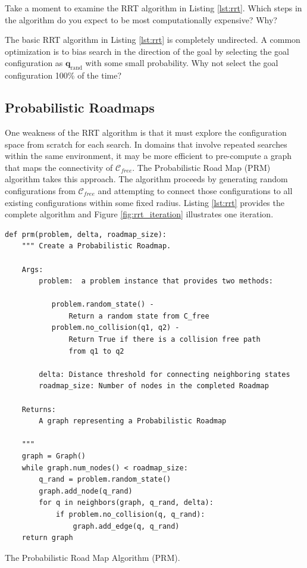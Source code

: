 \begin{exercise}
  Take a moment to examine the RRT algorithm in Listing \ref{lst:rrt}.
  Which steps in the algorithm do you expect to be most
  computationally expensive? Why?
\end{exercise}

\begin{exercise}
  The basic RRT algorithm in Listing \ref{lst:rrt} is completely
  undirected.  A common optimization is to bias search in the
  direction of the goal by selecting the goal configuration as
  $\mathbf{q}_{\text{rand}}$ with some small probability.  Why not
  select the goal configuration 100\% of the time?
\end{exercise}




\subsection{Probabilistic Roadmaps}

One weakness of the RRT algorithm is that it must explore the
configuration space from scratch for each search.  In domains that
involve repeated searches within the same environment, it may be more
efficient to pre-compute a graph that maps the connectivity of
$\mathcal{C}_{free}$. The Probabilistic Road Map (PRM) algorithm takes
this approach.  The algorithm proceeds by generating random
configurations from $\mathcal{C}_{free}$ and attempting to connect
those configurations to all existing configurations within some fixed
radius. Listing \ref{lst:rrt} provides the complete algorithm and
Figure \ref{fig:rrt_iteration} illustrates one iteration.

\begin{listing}[H]
\begin{verbatim}
def prm(problem, delta, roadmap_size):
    """ Create a Probabilistic Roadmap.

    Args:
        problem:  a problem instance that provides two methods:
            
           problem.random_state() -       
               Return a random state from C_free
           problem.no_collision(q1, q2) - 
               Return True if there is a collision free path 
               from q1 to q2

        delta: Distance threshold for connecting neighboring states
        roadmap_size: Number of nodes in the completed Roadmap 

    Returns: 
        A graph representing a Probabilistic Roadmap
                      
    """
    graph = Graph()
    while graph.num_nodes() < roadmap_size:
        q_rand = problem.random_state()
        graph.add_node(q_rand)
        for q in neighbors(graph, q_rand, delta):
            if problem.no_collision(q, q_rand):
                graph.add_edge(q, q_rand)
    return graph
\end{verbatim}
\caption{The Probabilistic Road Map Algorithm (PRM).}
\label{lst:prm}
\end{listing}

